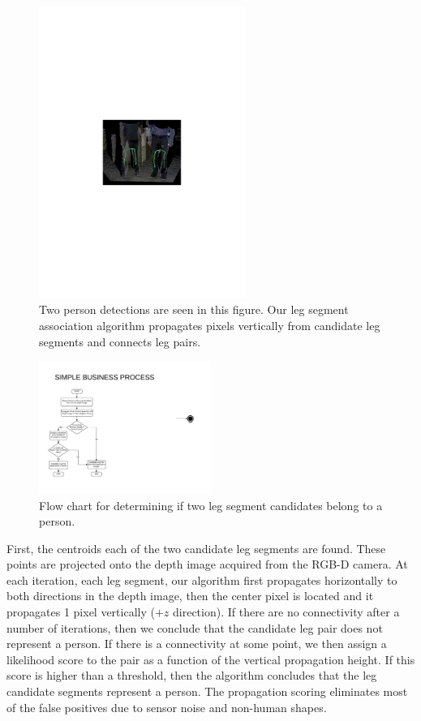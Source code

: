 \begin{figure}[ht!]
\centering
\includegraphics[width=0.6\textwidth]{pics/leg_connectivity}
\caption{Two person detections are seen in this figure. Our leg segment association algorithm propagates pixels vertically from candidate leg segments and connects leg pairs.}
\label{fig:leg_connectivity}
\end{figure}

\begin{figure}[ht!]
\centering
\includegraphics[width=0.5\textwidth]{pics/leg_connectivity_diagram}
\caption{Flow chart for determining if two leg segment candidates belong to a person.}
\label{fig:leg_connectivity_diagram}
\end{figure}

First, the centroids each of the two candidate leg segments are found.  These points are projected onto the depth image acquired from the RGB-D camera. At each iteration, each leg segment, our algorithm first propagates horizontally to both directions in the depth image, then the center pixel is located and it propagates 1 pixel vertically ($+z$ direction). If there are no connectivity after a number of iterations, then we conclude that the candidate leg pair does not represent a person. If there is a connectivity at some point, we then assign a likelihood score to the pair as a function of the vertical propagation height. If this score is higher than a threshold, then the algorithm concludes that the leg candidate segments represent a person. The propagation scoring eliminates most of the false positives due to sensor noise and non-human shapes.

